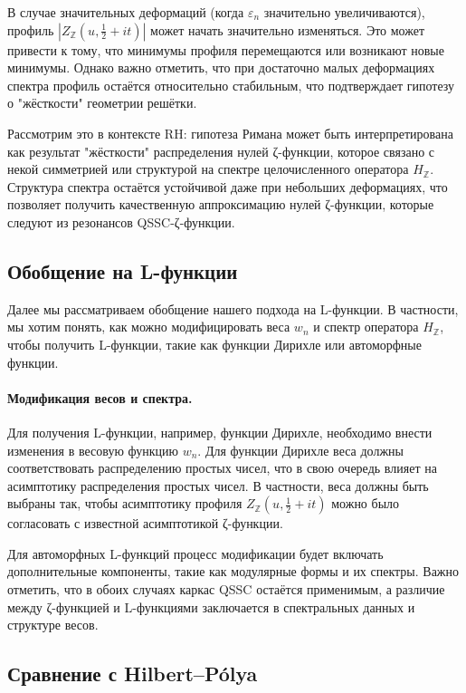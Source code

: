 \documentclass{article}
\numberwithin{equation}{section}
\theoremstyle{plain}
\theoremstyle{definition}
\theoremstyle{remark}
\begin{document}
В случае значительных деформаций (когда \( \varepsilon_n \) значительно увеличиваются), профиль \( |Z_{\mathbb{Z}}(u, \frac{1}{2} + it)| \) может начать значительно изменяться. Это может привести к тому, что минимумы профиля перемещаются или возникают новые минимумы. Однако важно отметить, что при достаточно малых деформациях спектра профиль остаётся относительно стабильным, что подтверждает гипотезу о "жёсткости" геометрии решётки.

Рассмотрим это в контексте RH: гипотеза Римана может быть интерпретирована как результат "жёсткости" распределения нулей ζ-функции, которое связано с некой симметрией или структурой на спектре целочисленного оператора \( H_{\mathbb{Z}} \). Структура спектра остаётся устойчивой даже при небольших деформациях, что позволяет получить качественную аппроксимацию нулей ζ-функции, которые следуют из резонансов QSSC-ζ-функции.

\subsection{Обобщение на L-функции}
\label{subsec:L-functions}

\noindent
Далее мы рассматриваем обобщение нашего подхода на L-функции. В частности, мы хотим понять, как можно модифицировать веса \( w_n \) и спектр оператора \( H_{\mathbb{Z}} \), чтобы получить L-функции, такие как функции Дирихле или автоморфные функции.

\paragraph{Модификация весов и спектра.}
\noindent
Для получения L-функции, например, функции Дирихле, необходимо внести изменения в весовую функцию \( w_n \). Для функции Дирихле веса должны соответствовать распределению простых чисел, что в свою очередь влияет на асимптотику распределения простых чисел. В частности, веса должны быть выбраны так, чтобы асимптотику профиля \( Z_{\mathbb{Z}}(u, \frac{1}{2} + it) \) можно было согласовать с известной асимптотикой ζ-функции.

Для автоморфных L-функций процесс модификации будет включать дополнительные компоненты, такие как модулярные формы и их спектры. Важно отметить, что в обоих случаях каркас QSSC остаётся применимым, а различие между ζ-функцией и L-функциями заключается в спектральных данных и структуре весов.

\subsection{Сравнение с Hilbert–Pólya}
\label{subsec:comparison-Hilbert-Pólya}
\end{document}
